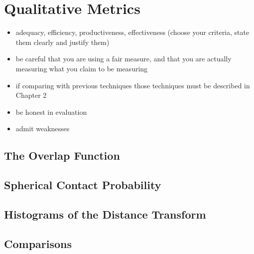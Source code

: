 

\chapter{Qualitative Metrics}

\mynote
{
\begin{itemize}
\item adequacy, efficiency, productiveness, effectiveness (choose your criteria, state them clearly and justify them)
\item be careful that you are using a fair measure, and that you are actually measuring what you claim to be measuring
\item if comparing with previous techniques those techniques must be described in Chapter 2
\item be honest in evaluation
\item admit weaknesses
\end{itemize}
}

\section{The Overlap Function}
\section{Spherical Contact Probability}
\section{Histograms of the Distance Transform}
\section{Comparisons}